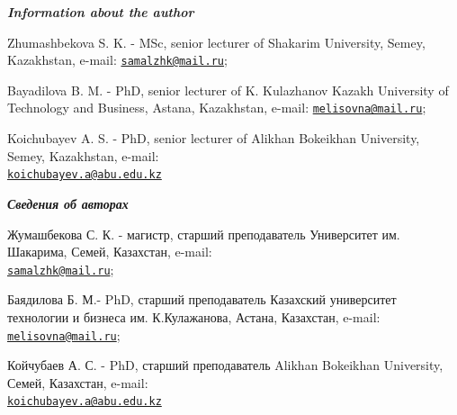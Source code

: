 \begin{authorinfo}
\emph{{\bfseries Information about the author}}

Zhumashbekova S. K. - MSc, senior lecturer of Shakarim University,
Semey, Kazakhstan, e-mail:
\href{mailto:samalzhk@mail.ru}{\nolinkurl{samalzhk@mail.ru}};

Bayadilova B. M. - PhD, senior lecturer of K. Kulazhanov Kazakh
University of Technology and Business, Astana, Kazakhstan, e-mail:
\href{mailto:melisovna@mail.ru}{\nolinkurl{melisovna@mail.ru}};

Koichubayev A. S. - PhD, senior lecturer of Alikhan Bokeikhan
University, Semey, Kazakhstan, e-mail:\\
\href{mailto:koichubayev.a@abu.edu.kz}{\nolinkurl{koichubayev.a@abu.edu.kz}}

\emph{{\bfseries Сведения об авторах}}

Жумашбекова С. К. - магистр, старший преподаватель Университет им.
Шакарима, Семей, Казахстан, e-mail:\\
\href{mailto:samalzhk@mail.ru}{\nolinkurl{samalzhk@mail.ru}};

Баядилова Б. М.- PhD, старший преподаватель Казахский университет
технологии и бизнеса им. К.Кулажанова, Астана, Казахстан, e-mail:
\href{mailto:melisovna@mail.ru}{\nolinkurl{melisovna@mail.ru}};

Койчубаев А. С. - PhD, старший преподаватель Alikhan Bokeikhan
University, Семей, Казахстан, e-mail:\\
\href{mailto:koichubayev.a@abu.edu.kz}{\nolinkurl{koichubayev.a@abu.edu.kz}}
\end{authorinfo}
